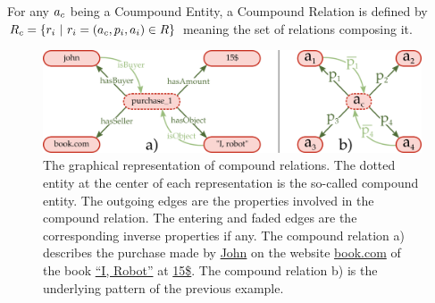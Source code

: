 \begin{definition} 
\label{the:compound_relation}
For any $a_c$ being a Coumpound Entity, a Coumpound Relation is defined by $R_c = \{ r_i\ |\  r_i = (a_c, p_i, a_i) \in R\}$ meaning the set of relations composing it.
\end{definition}

\begin{figure}[ht!]
\centering
\includegraphics[width=\textwidth]{figures/chapter7/CR.png}
\caption{\label{fig:chap7_cr} The graphical representation of compound relations. The dotted entity at the center of each representation is the so-called compound entity. The outgoing edges are the properties involved in the compound relation. The entering and faded edges are the corresponding inverse properties if any. The compound relation a) describes the purchase made by \underline{John} on the website \underline{book.com} of the book \underline{``I, Robot''} at \underline{15\$}. The compound relation b) is the underlying pattern of the previous example.}
\end{figure}

